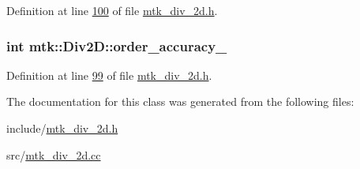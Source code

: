 Definition at line \hyperlink{mtk__div__2d_8h_source_l00100}{100} of file \hyperlink{mtk__div__2d_8h_source}{mtk\-\_\-div\-\_\-2d.\-h}.

\hypertarget{classmtk_1_1Div2D_a8502e254d1642bfdff16766dcde83381}{
\subsubsection[{order\-\_\-accuracy\-\_\-}]{\setlength{\rightskip}{0pt plus 5cm}int mtk\-::\-Div2\-D\-::order\-\_\-accuracy\-\_\-\hspace{0.3cm}{\ttfamily [private]}}}\label{classmtk_1_1Div2D_a8502e254d1642bfdff16766dcde83381}


Definition at line \hyperlink{mtk__div__2d_8h_source_l00099}{99} of file \hyperlink{mtk__div__2d_8h_source}{mtk\-\_\-div\-\_\-2d.\-h}.



The documentation for this class was generated from the following files\-:\begin{DoxyCompactItemize}
\item 
include/\hyperlink{mtk__div__2d_8h}{mtk\-\_\-div\-\_\-2d.\-h}\item 
src/\hyperlink{mtk__div__2d_8cc}{mtk\-\_\-div\-\_\-2d.\-cc}\end{DoxyCompactItemize}
